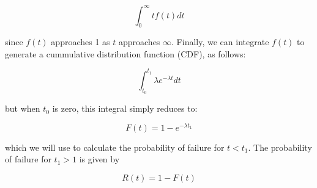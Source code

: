 \begin{equation}
	\int_0^\infty tf(t)dt
\end{equation}

since $f(t)$ approaches 1 as $t$ approaches $\infty$. Finally,
we can integrate $f(t)$ to generate a cummulative distribution
function (CDF), as follows:

\begin{equation}
	\int_{t_0}^{t_1} \lambda e^{-\lambda t}dt
\end{equation}

but when $t_0$ is zero, this integral simply reduces to:

\begin{equation}
	F(t) = 1 - e^{-\lambda t_1}
\end{equation}

which we will use to calculate the probability of failure for
$t < t_1$. The probability of failure for $t_1 > 1$ is given by

\begin{equation}
	R(t) = 1 - F(t)
\end{equation}

\label{evaluation}
